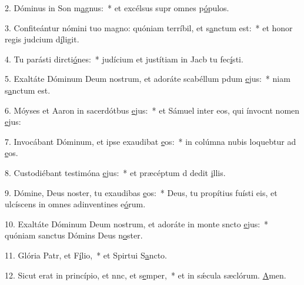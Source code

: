 2. Dóminus in Son m\uline{a}gnus:~* et excélsus supr omnes p\uline{ó}pulos.\par 
3. Confiteántur nómini tuo magno: quóniam terríbil, et s\uline{a}nctum est:~* et honor regis judcium d\uline{í}ligit.\par 
4. Tu parásti dircti\uline{ó}nes:~* judícium et justítiam in Jacb tu fec\uline{í}sti.\par 
5. Exaltáte Dóminum Deum nostrum, et adoráte scabéllum pdum \uline{e}jus:~* niam s\uline{a}nctum est.\par 
6. Móyses et Aaron in sacerdótbus \uline{e}jus:~* et Sámuel inter eos, qui ínvocnt nomen \uline{e}jus:\par 
7. Invocábant Dóminum, et ipse exaudibat \uline{e}os:~* in colúmna nubis loquebtur ad \uline{e}os.\par 
8. Custodiébant testimóna \uline{e}jus:~* et præcéptum d dedit \uline{i}llis.\par 
9. Dómine, Deus noster, tu exaudibas \uline{e}os:~* Deus, tu propítius fuísti eis, et ulcíscens in omnes adinventines e\uline{ó}rum.\par 
10. Exaltáte Dóminum Deum nostrum, et adoráte in monte sncto \uline{e}jus:~* quóniam sanctus Dómins Deus n\uline{o}ster.\par 
11. Glória Patr, et F\uline{í}lio,~* et Spirtui S\uline{a}ncto.\par 
12. Sicut erat in princípio, et nnc, et s\uline{e}mper,~* et in sǽcula sæclórum. \uline{A}men.\par 
